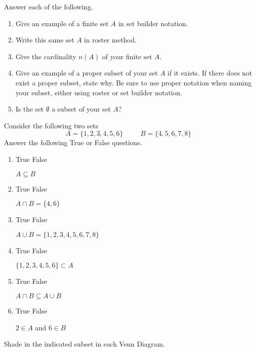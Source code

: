 \documentclass[addpoints,12pt]{exam}
\newcommand{\tft}{
\begin{oneparcheckboxes}
\CorrectChoice True
\choice False
	\end{oneparcheckboxes}
}
\newcommand{\tff}{
\begin{oneparcheckboxes}
\choice True
\CorrectChoice False
	\end{oneparcheckboxes}
}
\begin{document}
\begin{questions}
	\question Answer each of the following. \begin{enumerate}[label=\alph*)]
	    \item Give an example of a finite set $A$ in set builder notation. \vfill
			\item Write this same set $A$ in roster method. \vfill
			\item Give the cardinality $n(A)$ of your finite set $A$. \vfill
			\item Give an example of a proper subset of your set $A$ if it exists. If there does not exist a proper subset, state why. Be sure to use proper notation when naming your subset, either using roster or set builder notation. \vfill
			\item Is the set $\emptyset$ a subset of your set $A$?
	\end{enumerate} \vfill



	\question Consider the following two sets 
	\[
	A=\{1,2,3,4,5,6\} \hspace{30pt} B = \{4,5,6,7,8\}
	\]
	Answer the following True or False questions. 
	\begin{enumerate}[label = \alph*)]
		\item \tff $A\subseteq B$
		\item \tft $A\cap B = \{4,6\}$
		\item \tff $A\cup B = \{1,2,3,4,5,6,7,8\}$
		\item \tft $\{1,2,3,4,5,6\} \subset A$ 
		\item \tft $A\cap B \subseteq A\cup B$
		\item \tff $2\in A$ and $6\in B$ 
	\end{enumerate}

	\newpage

\question
Shade in the indicated subset in each Venn Diagram. 

\begin{multicols}{2}


\end{multicols}
\end{questions}
\end{document}
